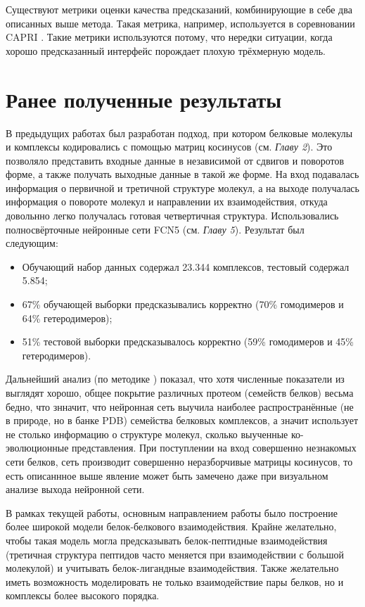 Существуют метрики оценки качества предсказаний, комбинирующие в себе два описанных выше метода. Такая метрика, например, используется в соревновании CAPRI \cite{basu}. Такие метрики используются потому, что нередки ситуации, когда хорошо предсказанный интерфейс порождает плохую трёхмерную модель.

\section{Ранее полученные результаты}
В предыдущих работах \cite{prip2023} был разработан подход, при котором белковые молекулы и комплексы кодировались с помощью матриц косинусов (см. \textit{Главу 2}). Это позволяло представить входные данные в независимой от сдвигов и поворотов форме, а также получать выходные данные в такой же форме. На вход подавалась информация о первичной и третичной структуре молекул, а на выходе получалась информация о повороте молекул и направлении их взаимодействия, откуда довольнно легко получалась готовая четвертичная структура. Использовались полносвёрточные нейронные сети FCN5 (см. \textit{Главу 5}). Результат был следующим:
\begin{itemize}
\item Обучающий набор данных содержал 23.344 комплексов, тестовый содержал 5.854;
\item 67\% обучающей выборки предсказывались корректно (70\% гомодимеров и 64\% гетеродимеров);
\item 51\% тестовой выборки предсказывалось корректно (59\% гомодимеров и 45\% гетеродимеров).
\end{itemize}

Дальнейший анализ (по методике \cite{zhu}) показал, что хотя численные показатели из \cite{prip2023} выглядят хорошо, общее покрытие различных протеом (семейств белков) весьма бедно, что знначит, что нейронная сеть выучила наиболее распространённые (не в природе, но в банке PDB) семейства белковых комплексов, а значит использует не столько информацию о структуре молекул, сколько выученные ко-эволюционные представления. При поступлении на вход совершенно незнакомых сети белков, сеть производит совершенно неразборчивые матрицы косинусов, то есть описаннное выше явление может быть замечено даже при визуальном анализе выхода нейронной сети.

В рамках текущей работы, основным направлением работы было построение более широкой модели белок-белкового взаимодействия. Крайне желательно, чтобы такая модель могла предсказывать белок-пептидные взаимодействия (третичная структура пептидов часто меняется при взаимодействии с большой молекулой) и учитывать белок-лигандные взаимодействия. Также желательно иметь возможность моделировать не только взаимодействие пары белков, но и комплексы более высокого порядка.






